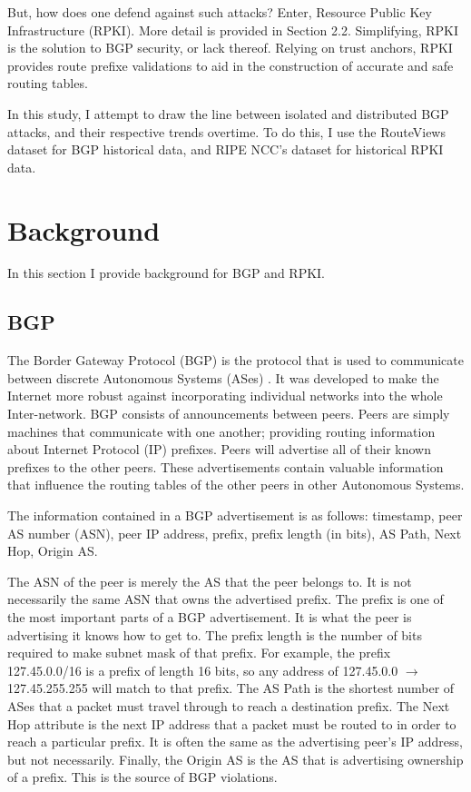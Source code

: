 But, how does one defend against such attacks? Enter, Resource Public Key
Infrastructure (RPKI). More detail is provided in Section 2.2. Simplifying, RPKI
is the solution to BGP security\cite{rpki-wiki}, or lack thereof. Relying on
trust anchors, RPKI provides route prefixe validations to aid in the
construction of accurate and safe routing tables.

In this study, I attempt to draw the line between isolated and distributed BGP
attacks, and their respective trends overtime. To do this, I use the RouteViews
dataset for BGP historical data, and RIPE NCC's dataset for historical RPKI
data.

\section{Background}
In this section I provide background for BGP and RPKI.

\subsection{BGP}
The Border Gateway Protocol (BGP) is the protocol that is used to communicate
between discrete Autonomous Systems (ASes) \cite{bgp}. It was developed to make
the Internet more robust against incorporating individual networks into the
whole Inter-network. BGP consists of announcements between peers. Peers are
simply machines that communicate with one another; providing routing information
about Internet Protocol (IP) prefixes. Peers will advertise all of their known
prefixes to the other peers. These advertisements contain valuable information
that influence the routing tables of the other peers in other Autonomous
Systems.

The information contained in a BGP advertisement is as follows: timestamp, peer
AS number (ASN), peer IP address, prefix, prefix length (in bits), AS Path, Next
Hop, Origin AS.

The ASN of the peer is merely the AS that the peer belongs to. It is not
necessarily the same ASN that owns the advertised prefix. The prefix is one of
the most important parts of a BGP advertisement. It is what the peer is
advertising it knows how to get to. The prefix length is the number of bits
required to make subnet mask of that prefix. For example, the prefix
127.45.0.0/16 is a prefix of length 16 bits, so any address of 127.45.0.0
$\rightarrow$ 127.45.255.255 will match to that prefix. The AS Path is the
shortest number of ASes that a packet must travel through to reach a destination
prefix. The Next Hop attribute is the next IP address that a packet must be
routed to in order to reach a particular prefix. It is often the same as the
advertising peer's IP address, but not necessarily. Finally, the Origin AS is
the AS that is advertising ownership of a prefix. This is the source of BGP
violations.

